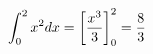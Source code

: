 \documentclass[preview]{standalone}
\begin{document}
\begin{align*}
\special{dvisvgm:raw <g id='unique000'>}\int_0^2 x^2 dx = \left[\frac{x^3}{3}\right]_0^2 = \frac{8}{3}\special{dvisvgm:raw </g>}
\end{align*}
\end{document}
